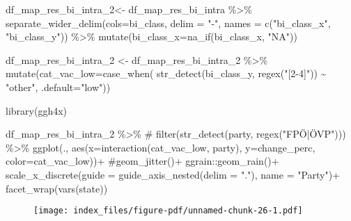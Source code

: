 \documentclass[
  letterpaper,
  DIV=11,
  numbers=noendperiod,
  oneside]{scrartcl}
\newenvironment{Shaded}{\begin{snugshade}}{\end{snugshade}}
\newcommand{\AttributeTok}[1]{\textcolor[rgb]{0.40,0.45,0.13}{#1}}
\newcommand{\CommentTok}[1]{\textcolor[rgb]{0.37,0.37,0.37}{#1}}
\newcommand{\FunctionTok}[1]{\textcolor[rgb]{0.28,0.35,0.67}{#1}}
\newcommand{\NormalTok}[1]{\textcolor[rgb]{0.00,0.23,0.31}{#1}}
\newcommand{\OtherTok}[1]{\textcolor[rgb]{0.00,0.23,0.31}{#1}}
\newcommand{\SpecialCharTok}[1]{\textcolor[rgb]{0.37,0.37,0.37}{#1}}
\newcommand{\StringTok}[1]{\textcolor[rgb]{0.13,0.47,0.30}{#1}}
\begin{document}
\begin{Shaded}
\begin{Highlighting}[]
\NormalTok{df\_map\_res\_bi\_intra\_2}\OtherTok{\textless{}{-}}\NormalTok{ df\_map\_res\_bi\_intra }\SpecialCharTok{\%\textgreater{}\%} 
  \FunctionTok{separate\_wider\_delim}\NormalTok{(}\AttributeTok{cols=}\NormalTok{bi\_class, }\AttributeTok{delim =} \StringTok{"{-}"}\NormalTok{, }\AttributeTok{names =} \FunctionTok{c}\NormalTok{(}\StringTok{"bi\_class\_x"}\NormalTok{, }\StringTok{"bi\_class\_y"}\NormalTok{)) }\SpecialCharTok{\%\textgreater{}\%} 
  \FunctionTok{mutate}\NormalTok{(}\AttributeTok{bi\_class\_x=}\FunctionTok{na\_if}\NormalTok{(bi\_class\_x, }\StringTok{"NA"}\NormalTok{))}


\NormalTok{df\_map\_res\_bi\_intra\_2 }\OtherTok{\textless{}{-}}\NormalTok{ df\_map\_res\_bi\_intra\_2 }\SpecialCharTok{\%\textgreater{}\%} 
  \FunctionTok{mutate}\NormalTok{(}\AttributeTok{cat\_vac\_low=}\FunctionTok{case\_when}\NormalTok{(}
    \FunctionTok{str\_detect}\NormalTok{(bi\_class\_y, }\FunctionTok{regex}\NormalTok{(}\StringTok{"[2{-}4]"}\NormalTok{)) }\SpecialCharTok{\textasciitilde{}} \StringTok{"other"}\NormalTok{,}
    \AttributeTok{.default=}\StringTok{"low"}\NormalTok{))}

\FunctionTok{library}\NormalTok{(ggh4x)}

\NormalTok{df\_map\_res\_bi\_intra\_2 }\SpecialCharTok{\%\textgreater{}\%} 
 \CommentTok{\# filter(str\_detect(party, regex("FPÖ|ÖVP"))) \%\textgreater{}\% }
  \FunctionTok{ggplot}\NormalTok{(., }\FunctionTok{aes}\NormalTok{(}\AttributeTok{x=}\FunctionTok{interaction}\NormalTok{(cat\_vac\_low, party), }
                \AttributeTok{y=}\NormalTok{change\_perc,}
                \AttributeTok{color=}\NormalTok{cat\_vac\_low))}\SpecialCharTok{+}
  \CommentTok{\#geom\_jitter()+}
\NormalTok{  ggrain}\SpecialCharTok{::}\FunctionTok{geom\_rain}\NormalTok{()}\SpecialCharTok{+}
  \FunctionTok{scale\_x\_discrete}\NormalTok{(}\AttributeTok{guide =} \FunctionTok{guide\_axis\_nested}\NormalTok{(}\AttributeTok{delim =} \StringTok{"."}\NormalTok{), }\AttributeTok{name =} \StringTok{"Party"}\NormalTok{)}\SpecialCharTok{+}
  \FunctionTok{facet\_wrap}\NormalTok{(}\FunctionTok{vars}\NormalTok{(state))}
\end{Highlighting}
\end{Shaded}

\begin{figure}[H]

\texttt{[image: index\_files/figure-pdf/unnamed-chunk-26-1.pdf]} \hfill{}

\end{figure}
\end{document}
